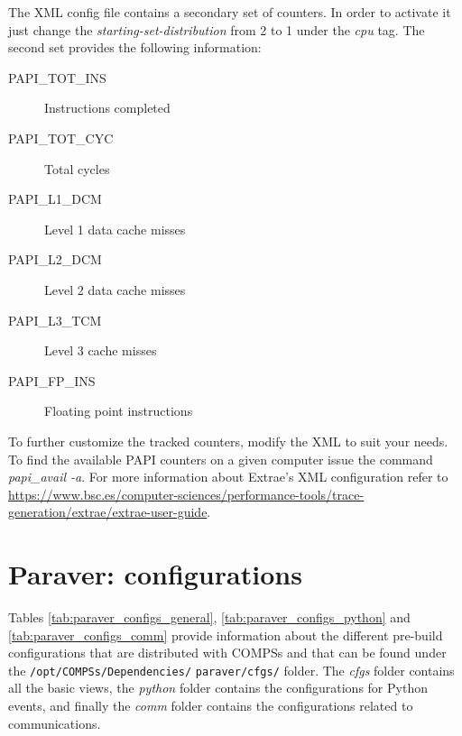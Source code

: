 The XML config file contains a secondary set of counters. In order to activate it just change the \textit{starting-set-distribution} from 2 to 1 under the \textit{cpu} tag. The second set provides the following information:

\begin{description}
 \item [PAPI\_TOT\_INS] Instructions completed
 \item [PAPI\_TOT\_CYC] Total cycles
 \item [PAPI\_L1\_DCM] Level 1 data cache misses
 \item [PAPI\_L2\_DCM] Level 2 data cache misses
 \item [PAPI\_L3\_TCM] Level 3 cache misses
 \item [PAPI\_FP\_INS] Floating point instructions
\end{description}

To further customize the tracked counters, modify the XML to suit your needs. To find the available PAPI counters on a given computer
issue the command \textit{papi\_avail -a}. For more information about Extrae's XML configuration refer to
\url{https://www.bsc.es/computer-sciences/performance-tools/trace-generation/extrae/extrae-user-guide}.


\section{Paraver: configurations}
\label{sec:configs}

Tables \ref{tab:paraver_configs_general}, \ref{tab:paraver_configs_python} and \ref{tab:paraver_configs_comm} provide information 
about the different pre-build configurations that are distributed with COMPSs and that can be found under 
the \verb|/opt/COMPSs/Dependencies/| \verb|paraver/cfgs/| folder. The \textit{cfgs} folder contains all the basic views, the \textit{python}
folder contains the configurations for Python events, and finally the \textit{comm} folder contains the configurations related 
to communications.

~ \newline

